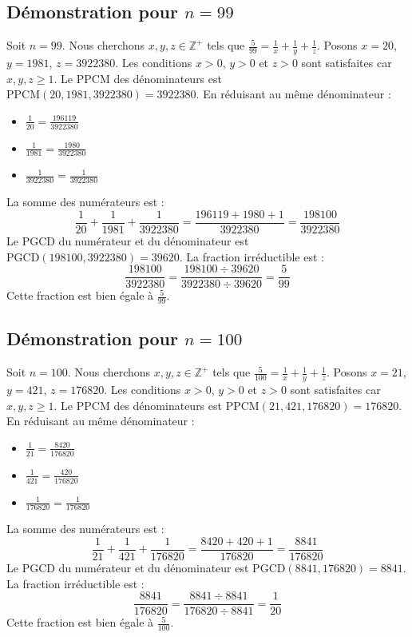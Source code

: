 \documentclass[11pt,a4paper]{article}
\begin{document}
\subsection{Démonstration pour $n = 99$}
Soit $n = 99$. Nous cherchons $x, y, z \in \mathbb{Z}^{+}$ tels que $\frac{5}{99} = \frac{1}{x} + \frac{1}{y} + \frac{1}{z}$.
Posons $x = 20$, $y = 1981$, $z = 3922380$.
Les conditions $x > 0$, $y > 0$ et $z > 0$ sont satisfaites car $x, y, z \geq 1$.
Le PPCM des dénominateurs est $\text{PPCM}(20, 1981, 3922380) = 3922380$.
En réduisant au même dénominateur :
\begin{itemize}
    \item $\frac{1}{20} = \frac{196119}{3922380}$
    \item $\frac{1}{1981} = \frac{1980}{3922380}$
    \item $\frac{1}{3922380} = \frac{1}{3922380}$
\end{itemize}
La somme des numérateurs est :
$$ \frac{1}{20} + \frac{1}{1981} + \frac{1}{3922380} = \frac{196119 + 1980 + 1}{3922380} = \frac{198100}{3922380} $$
Le PGCD du numérateur et du dénominateur est $\text{PGCD}(198100, 3922380) = 39620$.
La fraction irréductible est :
$$ \frac{198100}{3922380} = \frac{198100 \div 39620}{3922380 \div 39620} = \frac{5}{99} $$
Cette fraction est bien égale à $\frac{5}{99}$.

\subsection{Démonstration pour $n = 100$}
Soit $n = 100$. Nous cherchons $x, y, z \in \mathbb{Z}^{+}$ tels que $\frac{5}{100} = \frac{1}{x} + \frac{1}{y} + \frac{1}{z}$.
Posons $x = 21$, $y = 421$, $z = 176820$.
Les conditions $x > 0$, $y > 0$ et $z > 0$ sont satisfaites car $x, y, z \geq 1$.
Le PPCM des dénominateurs est $\text{PPCM}(21, 421, 176820) = 176820$.
En réduisant au même dénominateur :
\begin{itemize}
    \item $\frac{1}{21} = \frac{8420}{176820}$
    \item $\frac{1}{421} = \frac{420}{176820}$
    \item $\frac{1}{176820} = \frac{1}{176820}$
\end{itemize}
La somme des numérateurs est :
$$ \frac{1}{21} + \frac{1}{421} + \frac{1}{176820} = \frac{8420 + 420 + 1}{176820} = \frac{8841}{176820} $$
Le PGCD du numérateur et du dénominateur est $\text{PGCD}(8841, 176820) = 8841$.
La fraction irréductible est :
$$ \frac{8841}{176820} = \frac{8841 \div 8841}{176820 \div 8841} = \frac{1}{20} $$
Cette fraction est bien égale à $\frac{5}{100}$.
\end{document}
